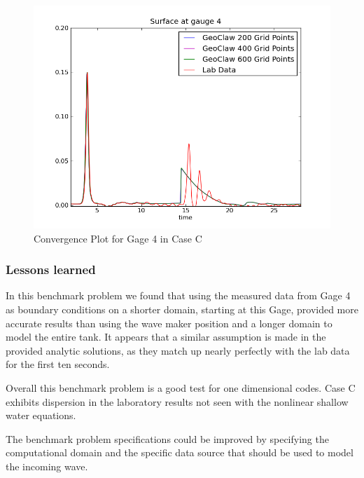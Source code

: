 \begin{figure}[ht]
\hfil\includegraphics[width=5in]{bp5/nonLinearCompare}\hfil
\caption{\label{fig:nonLinearConverge} Convergence Plot for Gage 4 in Case C }
\end{figure}

\subsubsection{Lessons learned}
In this benchmark problem we found that using the measured data from Gage 4 as boundary conditions on a shorter domain, starting at this Gage, provided more accurate results than using the wave maker position and a longer domain to model the entire tank.  It appears that a similar assumption is made in the provided analytic solutions, as they match up nearly perfectly with the lab data for the first ten seconds.  

Overall this benchmark problem is a good test for one dimensional codes.  
Case C exhibits dispersion in the laboratory results not seen with the
nonlinear shallow water equations.

The benchmark problem specifications could be improved by specifying the computational domain and the specific data source that should be used to model the incoming wave. 

